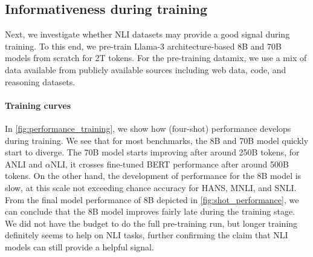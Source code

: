 \subsection{Informativeness during training}\label{subsec:during_training}

Next, we investigate whether NLI datasets may provide a good signal during training.
To this end, we pre-train Llama-3 architecture-based 8B and 70B models from scratch for 2T tokens. For the pre-training datamix, we use a mix of data available from publicly available sources including web data, code, and reasoning datasets.

\paragraph{Training curves} In \cref{fig:performance_training}, we show how (four-shot) performance develops during training.
We see that for most benchmarks, the 8B and 70B model quickly start to diverge.
The 70B model starts improving after around 250B tokens, for ANLI and $\alpha$NLI, it crosses fine-tuned BERT performance after around 500B tokens.
On the other hand, the development of performance for the 8B model is slow, at this scale not exceeding chance accuracy for HANS, MNLI, and SNLI.
From the final model performance of 8B depicted in \cref{fig:shot_performance}, we can conclude that the 8B model improves fairly late during the training stage.
We did not have the budget to do the full pre-training run, but longer training definitely seems to help on NLI tasks, further confirming the claim that NLI models can still provide a helpful signal.

